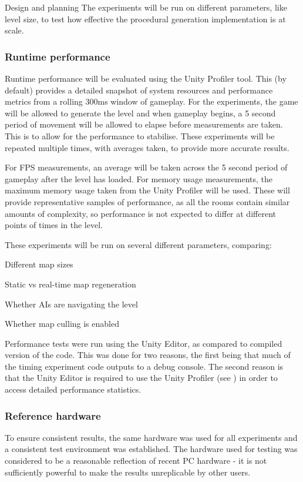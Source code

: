 \documentclass[final]{cmpreport}
\begin{document}
\begin{section}{Design and planning}
The experiments will be run on different parameters, like level size, to test how effective the procedural generation implementation is at scale.

\subsubsection{Runtime performance}
Runtime performance will be evaluated using the Unity Profiler tool. This (by default) provides a detailed snapshot of system resources and performance metrics from a rolling 300ms window of gameplay. For the experiments, the game will be allowed to generate the level and when gameplay begins, a 5 second period of movement will be allowed to elapse before measurements are taken. This is to allow for the performance to stabilise. These experiments will be repeated multiple times, with averages taken, to provide more accurate results.

For FPS measurements, an average will be taken across the 5 second period of gameplay after the level has loaded. For memory usage measurements, the maximum memory usage taken from the Unity Profiler will be used. These will provide representative samples of performance, as all the rooms contain similar amounts of complexity, so performance is not expected to differ at different points of times in the level.

These experiments will be run on several different parameters, comparing:

\begin{compactitem}
    \item{Different map sizes}
    \item{Static vs real-time map regeneration}
    \item{Whether AIs are navigating the level}
    \item{Whether map culling is enabled}
\end{compactitem}

Performance tests were run using the Unity Editor, as compared to compiled version of the code. This was done for two reasons, the first being that much of the timing experiment code outputs to a debug console. The second reason is that the Unity Editor is required to use the Unity Profiler (see \citet{technologies_2019}) in order to access detailed performance statistics.

\subsubsection{Reference hardware}
To ensure consistent results, the same hardware was used for all experiments and a consistent test environment was established. The hardware used for testing was considered to be a reasonable reflection of recent PC hardware - it is not sufficiently powerful to make the results unreplicable by other users.


\end{section}
\end{document}
